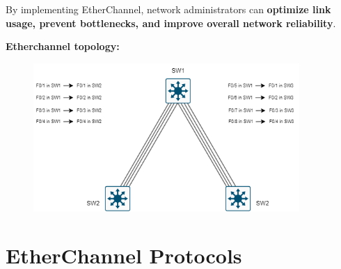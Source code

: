 \documentclass[a4paper]{article}
\begin{document}
By implementing EtherChannel, network administrators can \textbf{optimize link usage, prevent bottlenecks, and improve overall network reliability}.

\newpage
\textbf{Etherchannel topology:}
\vspace{4cm}
\begin{figure}[h]
	\centering
	\includegraphics[width=0.9\textwidth]{img/Aggrigation-manual-01.png}
	\caption{\textit{}}
\end{figure}
\newpage
\section{EtherChannel Protocols}
\end{document}
